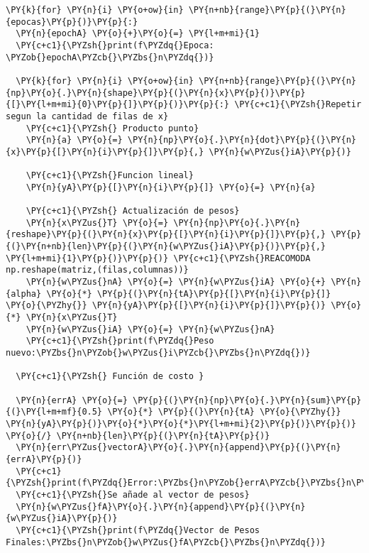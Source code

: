     \begin{tcolorbox}[breakable, size=fbox, boxrule=1pt, pad at break*=1mm,colback=cellbackground, colframe=cellborder]
\begin{Verbatim}[commandchars=\\\{\}]
\PY{k}{for} \PY{n}{i} \PY{o+ow}{in} \PY{n+nb}{range}\PY{p}{(}\PY{n}{epocas}\PY{p}{)}\PY{p}{:}
  \PY{n}{epochA} \PY{o}{+}\PY{o}{=} \PY{l+m+mi}{1}
  \PY{c+c1}{\PYZsh{}print(f\PYZdq{}Epoca: \PYZob{}epochA\PYZcb{}\PYZbs{}n\PYZdq{})}

  \PY{k}{for} \PY{n}{i} \PY{o+ow}{in} \PY{n+nb}{range}\PY{p}{(}\PY{n}{np}\PY{o}{.}\PY{n}{shape}\PY{p}{(}\PY{n}{x}\PY{p}{)}\PY{p}{[}\PY{l+m+mi}{0}\PY{p}{]}\PY{p}{)}\PY{p}{:} \PY{c+c1}{\PYZsh{}Repetir segun la cantidad de filas de x}
    \PY{c+c1}{\PYZsh{} Producto punto}
    \PY{n}{a} \PY{o}{=} \PY{n}{np}\PY{o}{.}\PY{n}{dot}\PY{p}{(}\PY{n}{x}\PY{p}{[}\PY{n}{i}\PY{p}{]}\PY{p}{,} \PY{n}{w\PYZus{}iA}\PY{p}{)}

    \PY{c+c1}{\PYZsh{}Funcion lineal}
    \PY{n}{yA}\PY{p}{[}\PY{n}{i}\PY{p}{]} \PY{o}{=} \PY{n}{a}

    \PY{c+c1}{\PYZsh{} Actualización de pesos}
    \PY{n}{x\PYZus{}T} \PY{o}{=} \PY{n}{np}\PY{o}{.}\PY{n}{reshape}\PY{p}{(}\PY{n}{x}\PY{p}{[}\PY{n}{i}\PY{p}{]}\PY{p}{,} \PY{p}{(}\PY{n+nb}{len}\PY{p}{(}\PY{n}{w\PYZus{}iA}\PY{p}{)}\PY{p}{,} \PY{l+m+mi}{1}\PY{p}{)}\PY{p}{)} \PY{c+c1}{\PYZsh{}REACOMODA np.reshape(matriz,(filas,columnas))}
    \PY{n}{w\PYZus{}nA} \PY{o}{=} \PY{n}{w\PYZus{}iA} \PY{o}{+} \PY{n}{alpha} \PY{o}{*} \PY{p}{(}\PY{n}{tA}\PY{p}{[}\PY{n}{i}\PY{p}{]} \PY{o}{\PYZhy{}} \PY{n}{yA}\PY{p}{[}\PY{n}{i}\PY{p}{]}\PY{p}{)} \PY{o}{*} \PY{n}{x\PYZus{}T}
    \PY{n}{w\PYZus{}iA} \PY{o}{=} \PY{n}{w\PYZus{}nA}
    \PY{c+c1}{\PYZsh{}print(f\PYZdq{}Peso nuevo:\PYZbs{}n\PYZob{}w\PYZus{}i\PYZcb{}\PYZbs{}n\PYZdq{})}
 
  \PY{c+c1}{\PYZsh{} Función de costo }

  \PY{n}{errA} \PY{o}{=} \PY{p}{(}\PY{n}{np}\PY{o}{.}\PY{n}{sum}\PY{p}{(}\PY{l+m+mf}{0.5} \PY{o}{*} \PY{p}{(}\PY{n}{tA} \PY{o}{\PYZhy{}} \PY{n}{yA}\PY{p}{)}\PY{o}{*}\PY{o}{*}\PY{l+m+mi}{2}\PY{p}{)}\PY{p}{)} \PY{o}{/} \PY{n+nb}{len}\PY{p}{(}\PY{n}{tA}\PY{p}{)}
  \PY{n}{err\PYZus{}vectorA}\PY{o}{.}\PY{n}{append}\PY{p}{(}\PY{n}{errA}\PY{p}{)}
  \PY{c+c1}{\PYZsh{}print(f\PYZdq{}Error:\PYZbs{}n\PYZob{}errA\PYZcb{}\PYZbs{}n\PYZdq{})}
  \PY{c+c1}{\PYZsh{}Se añade al vector de pesos}
  \PY{n}{w\PYZus{}fA}\PY{o}{.}\PY{n}{append}\PY{p}{(}\PY{n}{w\PYZus{}iA}\PY{p}{)}
  \PY{c+c1}{\PYZsh{}print(f\PYZdq{}Vector de Pesos Finales:\PYZbs{}n\PYZob{}w\PYZus{}fA\PYZcb{}\PYZbs{}n\PYZdq{})}


\end{Verbatim}
\end{tcolorbox}
